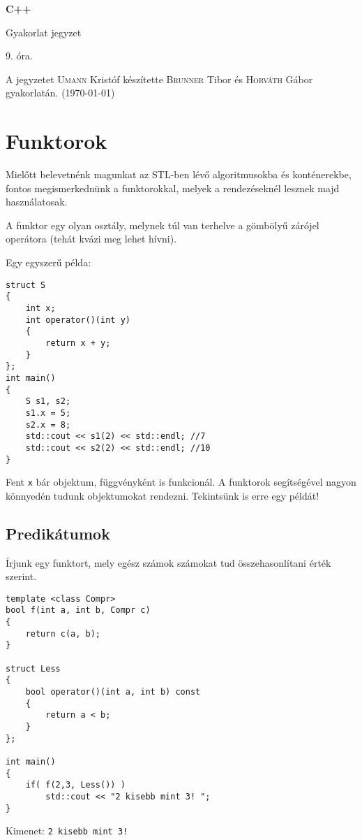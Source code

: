\documentclass[a4paper,11.5pt,table]{article}
\begin{document}
	\setlength\parindent{0pt}
	\def\<{<\hspace{0mm}<}
	
	\theoremstyle{definition}
	\newtheorem{note}{Megjegyzés}[subsection]
	
	\begin{center}
		{\LARGE\textbf{C++}}
		
		{\Large Gyakorlat jegyzet}
		
		9. óra.
	\end{center}
	A jegyzetet \textsc{Umann} Kristóf készítette \textsc{Brunner} Tibor és \textsc{Horváth} Gábor gyakorlatán. (\today)
	
	\section{Funktorok}
	Mielőtt belevetnénk magunkat az STL-ben lévő algoritmusokba és konténerekbe, fontos megismerkednünk a funktorokkal, melyek a rendezéseknél lesznek majd használatosak.
	\medskip
	
	A funktor egy olyan osztály, melynek túl van terhelve a gömbölyű zárójel operátora (tehát kvázi meg lehet hívni).
	
	\smallskip
	Egy egyszerű példa:
	\begin{lstlisting}
struct S
{
	int x;
	int operator()(int y)
	{
		return x + y;
	}
};
int main()
{
	S s1, s2;
	s1.x = 5;
	s2.x = 8;
	std::cout << s1(2) << std::endl; //7
	std::cout << s2(2) << std::endl; //10
}
	\end{lstlisting}
	Fent \texttt{x} bár objektum, függvényként is funkcionál. A funktorok segítségével nagyon könnyedén tudunk objektumokat rendezni. Tekintsünk is erre egy példát!
	\subsection{Predikátumok}
	Írjunk egy funktort, mely egész számok számokat tud összehasonlítani érték szerint.
	\begin{lstlisting}
template <class Compr>
bool f(int a, int b, Compr c)
{
	return c(a, b);
}

struct Less
{
	bool operator()(int a, int b) const
	{
		return a < b;
	}
};

int main()
{
	if( f(2,3, Less()) )
		std::cout << "2 kisebb mint 3! ";
}
	\end{lstlisting}
	Kimenet: \texttt{2 kisebb mint 3!}
	
\end{document}
